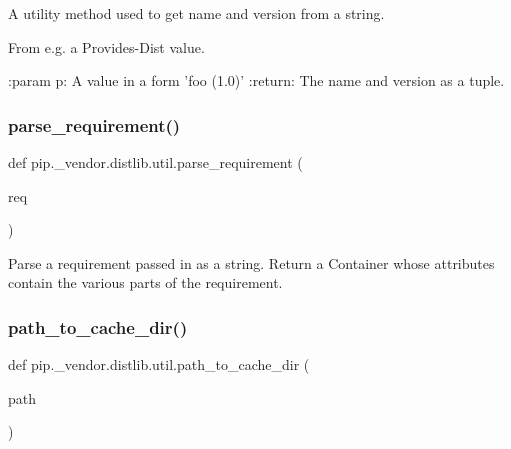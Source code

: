 \begin{DoxyVerb}A utility method used to get name and version from a string.

From e.g. a Provides-Dist value.

:param p: A value in a form 'foo (1.0)'
:return: The name and version as a tuple.
\end{DoxyVerb}
 \mbox{\label{namespacepip_1_1__vendor_1_1distlib_1_1util_aee45d476a44623cba51ca84e53e1d55c}} 
\subsubsection{\texorpdfstring{parse\+\_\+requirement()}{parse\_requirement()}}
{\footnotesize\ttfamily def pip.\+\_\+vendor.\+distlib.\+util.\+parse\+\_\+requirement (\begin{DoxyParamCaption}\item[{}]{req }\end{DoxyParamCaption})}

\begin{DoxyVerb}Parse a requirement passed in as a string. Return a Container
whose attributes contain the various parts of the requirement.
\end{DoxyVerb}
 \mbox{\label{namespacepip_1_1__vendor_1_1distlib_1_1util_a27ee35211a637c728142faac900199f7}} 
\subsubsection{\texorpdfstring{path\+\_\+to\+\_\+cache\+\_\+dir()}{path\_to\_cache\_dir()}}
{\footnotesize\ttfamily def pip.\+\_\+vendor.\+distlib.\+util.\+path\+\_\+to\+\_\+cache\+\_\+dir (\begin{DoxyParamCaption}\item[{}]{path }\end{DoxyParamCaption})}

